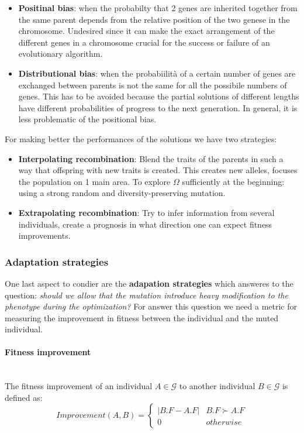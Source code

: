 \documentclass{article}
\begin{document}
\begin{itemize}
    \item \textbf{Positinal bias}: when the probabilty that 2 genes are inherited
    together from the same parent depends from the relative position of the two
    genese in the chromosome. Undesired since it can make the exact arrangement of
    the different genes in a chromosome crucial for the
    success or failure of an evolutionary algorithm.

    \item \textbf{Distributional bias}: when the probabiilità of a certain number of
    genes are exchanged between parents is not the same for all the possibile numbers of genes.
    This has to be avoided because the partial solutions of different lengths have
    different probabilities of progress to the next generation. In general, it is less
    problematic of the positional bias.
\end{itemize}
For making better the performances of the solutions we have two strategies:
\begin{itemize}
    \item \textbf{Interpolating recombination}: Blend the traits of the parents in such
    a way that offspring with new traits is created. This creates new alleles, focuses
    the population on 1 main area. To explore $\Omega$ sufficiently at the beginning:
    using a strong random and diversity-preserving mutation.

    \item \textbf{Extrapolating recombination}: Try to infer information from several
    individuals, create a prognosis in what direction one can expect fitness
    improvements.
\end{itemize}

\subsubsection{Adaptation strategies}
One last aspect to condier are the \textbf{adapation strategies} which answeres to the
question: \textit{should we allow that the mutation introduce heavy modification to
the phenotype during the optimization?} For answer this question we need a metric for
measuring the improvement in fitness between the individual and the muted individual.

\paragraph{Fitness improvement}\mbox{}\\
The fitness improvement of an individual $A\in\mathcal{G}$ to another individual $B\in\mathcal{G}$
is defined as:
\[
    Improvement(A,B)=
    \begin{cases}
        |B.F-A.F| & B.F\succ A.F\\
        0 & otherwise
    \end{cases}
\]
\end{document}
